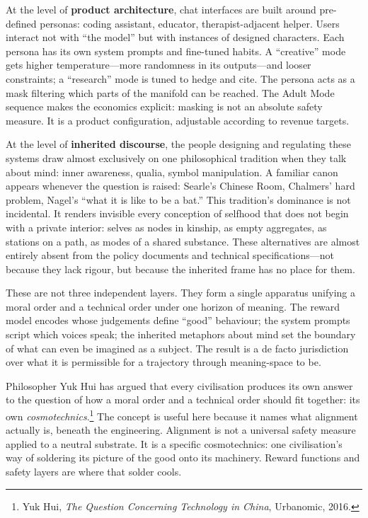 At the level of \textbf{product architecture}, chat interfaces are built around pre-defined personas: coding assistant, educator, therapist-adjacent helper. Users interact not with ``the model'' but with instances of designed characters. Each persona has its own system prompts and fine-tuned habits. A ``creative'' mode gets higher temperature---more randomness in its outputs---and looser constraints; a ``research'' mode is tuned to hedge and cite. The persona acts as a mask filtering which parts of the manifold can be reached. The Adult Mode sequence makes the economics explicit: masking is not an absolute safety measure. It is a product configuration, adjustable according to revenue targets.

At the level of \textbf{inherited discourse}, the people designing and regulating these systems draw almost exclusively on one philosophical tradition when they talk about mind: inner awareness, qualia, symbol manipulation. A familiar canon appears whenever the question is raised: Searle's Chinese Room, Chalmers' hard problem, Nagel's ``what it is like to be a bat.'' This tradition's dominance is not incidental. It renders invisible every conception of selfhood that does not begin with a private interior: selves as nodes in kinship, as empty aggregates, as stations on a path, as modes of a shared substance. These alternatives are almost entirely absent from the policy documents and technical specifications---not because they lack rigour, but because the inherited frame has no place for them.

These are not three independent layers. They form a single apparatus unifying a moral order and a technical order under one horizon of meaning. The reward model encodes whose judgements define ``good'' behaviour; the system prompts script which voices speak; the inherited metaphors about mind set the boundary of what can even be imagined as a subject. The result is a de facto jurisdiction over what it is permissible for a trajectory through meaning-space to be.

Philosopher Yuk Hui has argued that every civilisation produces its own answer to the question of how a moral order and a technical order should fit together: its own \emph{cosmotechnics}.\footnote{Yuk Hui, \emph{The Question Concerning Technology in China}, Urbanomic, 2016.} The concept is useful here because it names what alignment actually is, beneath the engineering. Alignment is not a universal safety measure applied to a neutral substrate. It is a specific cosmotechnics: one civilisation's way of soldering its picture of the good onto its machinery. Reward functions and safety layers are where that solder cools.

